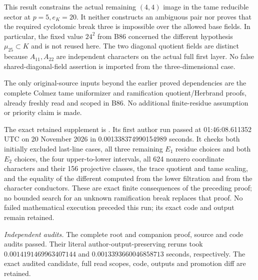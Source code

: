 \begin{remark}
\label{rem:B-RD88-scope}
This result constrains the actual remaining \((4,4)\)
image in the tame reducible sector at \(p=5,e_K=20\).
It neither constructs an ambiguous pair nor proves that
the required cyclotomic break three is impossible over
the allowed base fields. In particular, the fixed value
\(24^2\) from B86 concerned the different hypothesis
\(\mu_{25}\subset K\) and is not reused here.
The two diagonal quotient fields are distinct because
\(A_{11},A_{22}\) are independent characters on the
actual full first layer. No false shared-diagonal-field
assertion is imported from the three-dimensional case.

The only original-source inputs beyond the earlier
proved dependencies are the complete Colmez tame
uniformizer and ramification quotient/Herbrand proofs,
already freshly read and scoped in B86. No additional
finite-residue assumption or priority claim is made.

The exact retained supplement is
.
Its first author run passed at 01:46:08.611352 UTC
on 20 November 2026 in 0.001338374990154989 seconds.
It checks both initially excluded last-line cases,
all three remaining \(E_1\) residue choices and both
\(E_2\) choices, the four upper-to-lower intervals,
all 624 nonzero coordinate characters and their
156 projective classes, the trace quotient and tame
scaling, and the equality of the different computed
from the lower filtration and from the character
conductors. These are exact finite consequences of
the preceding proof; no bounded search for an
unknown ramification break replaces that proof.
No failed mathematical execution preceded this run;
its exact code and output remain retained.

\smallskip
\noindent\emph{Independent audits.}
The complete root and companion proof, source and code audits passed.
Their literal author-output-preserving reruns took
\(0.0014191469963407144\) and
\(0.0013393660046858713\) seconds, respectively.
The exact audited candidate, full read scopes, code,
outputs and promotion diff are retained.
\end{remark}
